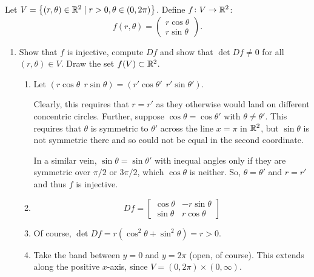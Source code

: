 \documentclass{article}
\begin{document}
\newpage

Let $V = \set*{ (r, \theta) \in \RR[2] \mid r > 0, \theta \in (0, 2\pi) }$. Define $f \from V \to \RR[2]$:
\[ f(r, \theta) = \begin{pmatrix} r \cos \theta \\ r \sin \theta \end{pmatrix}. \]

\begin{enumerate}[start=1,label={(\alph*)}]
  \item Show that $f$ is injective, compute $Df$ and show that $\det Df \ne 0$ for all $(r, \theta) \in V$.
        Draw the set $f(V) \subset \RR[2]$.

        \begin{enumerate}[start=1,label={\roman*\rparen}]
          \item Let $(r \cos \theta \ \ r\sin\theta) = (r' \cos \theta' \ \ r'\sin\theta')$.

                Clearly, this requires that $r = r'$ as they otherwise would land on different concentric circles.
                Further, suppose $\cos \theta = \cos \theta'$ with $\theta \ne \theta'$.
                This requires that $\theta$ is symmetric to $\theta'$ across the line $x = \pi$ in $\RR[2]$, but $\sin \theta$ is not symmetric there and so
                could not be equal in the second coordinate.

                In a similar vein, $\sin \theta = \sin \theta'$ with inequal angles only if they are symmetric over $\pi/2$ or $3\pi/2$,
                which $\cos \theta$ is neither. So, $\theta = \theta'$ and $r = r'$ and thus $f$ is injective.


          \item \[ Df = \begin{bmatrix} \cos \theta & -r \sin \theta \\ \sin \theta & r \cos\theta \end{bmatrix} \]
          \item Of course, $\det Df = r(\cos^{2}\theta + \sin^{2}\theta) = r > 0$.

          \item Take the band between $y = 0$ and $y = 2\pi$ (open, of course). This extends along the positive $x$-axis, since $V = (0, 2\pi) \times (0, \infty)$.
        \end{enumerate}


\end{enumerate}
\end{document}
